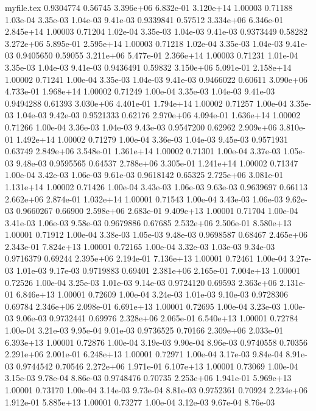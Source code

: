 \begin{filecontents}{myfile.tex}
0.9304774 0.56745 3.396e+06 6.832e-01 3.120e+14 1.00003 0.71188 1.03e-04 3.35e-03 1.04e-03 9.41e-03
0.9339841 0.57512 3.334e+06 6.346e-01 2.845e+14 1.00003 0.71204 1.02e-04 3.35e-03 1.04e-03 9.41e-03
0.9373449 0.58282 3.272e+06 5.895e-01 2.595e+14 1.00003 0.71218 1.02e-04 3.35e-03 1.04e-03 9.41e-03
0.9405650 0.59055 3.211e+06 5.477e-01 2.366e+14 1.00003 0.71231 1.01e-04 3.35e-03 1.04e-03 9.41e-03
0.9436491 0.59832 3.150e+06 5.091e-01 2.158e+14 1.00002 0.71241 1.00e-04 3.35e-03 1.04e-03 9.41e-03
0.9466022 0.60611 3.090e+06 4.733e-01 1.968e+14 1.00002 0.71249 1.00e-04 3.35e-03 1.04e-03 9.41e-03
0.9494288 0.61393 3.030e+06 4.401e-01 1.794e+14 1.00002 0.71257 1.00e-04 3.35e-03 1.04e-03 9.42e-03
0.9521333 0.62176 2.970e+06 4.094e-01 1.636e+14 1.00002 0.71266 1.00e-04 3.36e-03 1.04e-03 9.43e-03
0.9547200 0.62962 2.909e+06 3.810e-01 1.492e+14 1.00002 0.71279 1.00e-04 3.36e-03 1.04e-03 9.45e-03
0.9571931 0.63749 2.849e+06 3.548e-01 1.361e+14 1.00002 0.71301 1.00e-04 3.37e-03 1.05e-03 9.48e-03
0.9595565 0.64537 2.788e+06 3.305e-01 1.241e+14 1.00002 0.71347 1.00e-04 3.42e-03 1.06e-03 9.61e-03
0.9618142 0.65325 2.725e+06 3.081e-01 1.131e+14 1.00002 0.71426 1.00e-04 3.43e-03 1.06e-03 9.63e-03
0.9639697 0.66113 2.662e+06 2.874e-01 1.032e+14 1.00001 0.71543 1.00e-04 3.43e-03 1.06e-03 9.62e-03
0.9660267 0.66900 2.598e+06 2.683e-01 9.409e+13 1.00001 0.71704 1.00e-04 3.41e-03 1.06e-03 9.58e-03
0.9679886 0.67685 2.532e+06 2.506e-01 8.580e+13 1.00001 0.71912 1.00e-04 3.38e-03 1.05e-03 9.48e-03
0.9698587 0.68467 2.465e+06 2.343e-01 7.824e+13 1.00001 0.72165 1.00e-04 3.32e-03 1.03e-03 9.34e-03
0.9716379 0.69244 2.395e+06 2.194e-01 7.136e+13 1.00001 0.72461 1.00e-04 3.27e-03 1.01e-03 9.17e-03
0.9719883 0.69401 2.381e+06 2.165e-01 7.004e+13 1.00001 0.72526 1.00e-04 3.25e-03 1.01e-03 9.14e-03
0.9724120 0.69593 2.363e+06 2.131e-01 6.846e+13 1.00001 0.72609 1.00e-04 3.24e-03 1.01e-03 9.10e-03
0.9728306 0.69784 2.346e+06 2.098e-01 6.691e+13 1.00001 0.72695 1.00e-04 3.23e-03 1.00e-03 9.06e-03
0.9732441 0.69976 2.328e+06 2.065e-01 6.540e+13 1.00001 0.72784 1.00e-04 3.21e-03 9.95e-04 9.01e-03
0.9736525 0.70166 2.309e+06 2.033e-01 6.393e+13 1.00001 0.72876 1.00e-04 3.19e-03 9.90e-04 8.96e-03
0.9740558 0.70356 2.291e+06 2.001e-01 6.248e+13 1.00001 0.72971 1.00e-04 3.17e-03 9.84e-04 8.91e-03
0.9744542 0.70546 2.272e+06 1.971e-01 6.107e+13 1.00001 0.73069 1.00e-04 3.15e-03 9.78e-04 8.86e-03
0.9748476 0.70735 2.253e+06 1.941e-01 5.969e+13 1.00001 0.73170 1.00e-04 3.14e-03 9.73e-04 8.81e-03
0.9752361 0.70924 2.234e+06 1.912e-01 5.885e+13 1.00001 0.73277 1.00e-04 3.12e-03 9.67e-04 8.76e-03

\end{filecontents}
